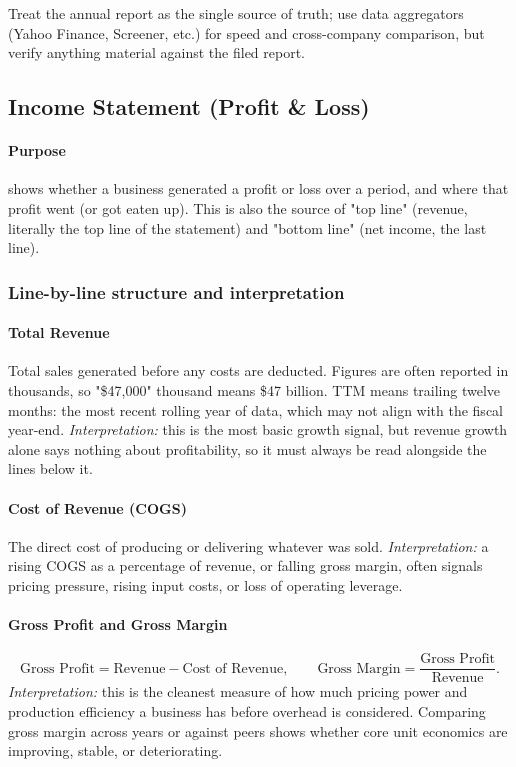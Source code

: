 \documentclass[12pt,openany]{book}
\begin{document}
Treat the annual report as the single source of truth; use data aggregators (Yahoo Finance, Screener, etc.) for speed and cross-company comparison, but verify anything material against the filed report.

\subsection{Income Statement (Profit \& Loss)}

\paragraph{Purpose} shows whether a business generated a profit or loss over a period, and where that profit went (or got eaten up). This is also the source of "top line" (revenue, literally the top line of the statement) and "bottom line" (net income, the last line).

\subsubsection{Line-by-line structure and interpretation}

\paragraph{Total Revenue} Total sales generated before any costs are deducted. Figures are often reported in thousands, so "\$47,000" thousand means \$47 billion. TTM means trailing twelve months: the most recent rolling year of data, which may not align with the fiscal year-end. \emph{Interpretation:} this is the most basic growth signal, but revenue growth alone says nothing about profitability, so it must always be read alongside the lines below it.

\paragraph{Cost of Revenue (COGS)} The direct cost of producing or delivering whatever was sold. \emph{Interpretation:} a rising COGS as a percentage of revenue, or falling gross margin, often signals pricing pressure, rising input costs, or loss of operating leverage.

\paragraph{Gross Profit and Gross Margin}
\begin{equation*}
    \text{Gross Profit} = \text{Revenue} - \text{Cost of Revenue}, \qquad
    \text{Gross Margin} = \frac{\text{Gross Profit}}{\text{Revenue}}.
\end{equation*}
\emph{Interpretation:} this is the cleanest measure of how much pricing power and production efficiency a business has before overhead is considered. Comparing gross margin across years or against peers shows whether core unit economics are improving, stable, or deteriorating.
\end{document}

